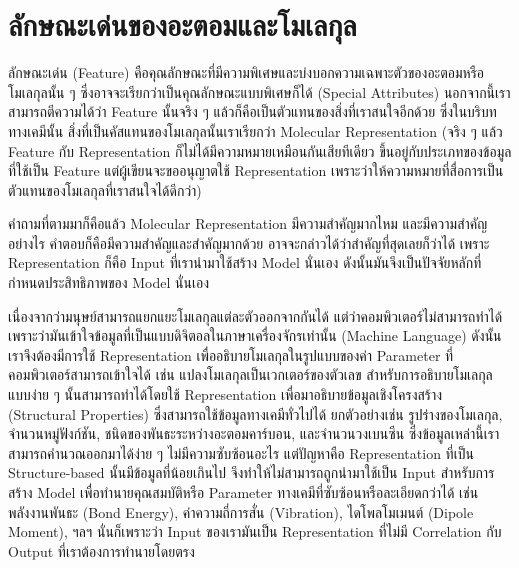

\chapter{ลักษณะเด่นของอะตอมและโมเลกุล}
\label{ch:feature}

ลักษณะเด่น (Feature) คือคุณลักษณะที่มีความพิเศษและบ่งบอกความเฉพาะตัวของอะตอมหรือโมเลกุลนั้น ๆ ซึ่งอาจจะเรียกว่าเป็นคุณลักษณะแบบพิเศษก็ได้ 
(Special Attributes) นอกจากนี้เราสามารถตีความได้ว่า Feature นั้นจริง ๆ แล้วก็คือเป็นตัวแทนของสิ่งที่เราสนใจอีกด้วย ซึ่งในบริบททางเคมีนั้น
สิ่งที่เป็นคัสแทนของโมเลกุลนั้นเราเรียกว่า Molecular Representation (จริง ๆ แล้ว Feature กับ Representation ก็ไม่ได้มีความหมายเหมือนกันเสียทีเดียว
ขึ้นอยู่กับประเภทของข้อมูลที่ใช้เป็น Feature แต่ผู้เขียนจะขออนุญาตใช้ Representation เพราะว่าให้ความหมายที่สื่อการเป็นตัวแทนของโมเลกุลที่เราสนใจได้ดีกว่า)\cite{stepisnik2021}

คำถามที่ตามมาก็คือแล้ว Molecular Representation มีความสำคัญมากไหม และมีความสำคัญอย่างไร คำตอบก็คือมีความสำคัญและสำคัญมากด้วย 
อาจจะกล่าวได้ว่าสำคัญที่สุดเลยก็ว่าได้ เพราะ Representation ก็คือ Input ที่เรานำมาใช้สร้าง Model นั่นเอง ดังนั้นมันจึงเป็นปัจจัยหลักที่กำหนดประสิทธิภาพของ Model นั่นเอง 

เนื่องจากว่ามนุษย์สามารถแยกแยะโมเลกุลแต่ละตัวออกจากกันได้ แต่ว่าคอมพิวเตอร์ไม่สามารถทำได้ เพราะว่ามันเข้าใจข้อมูลที่เป็นแบบดิจิตอลในภาษาเครื่องจักรเท่านั้น (Machine Language)
ดังนั้นเราจึงต้องมีการใช้ Representation เพื่ออธิบายโมเลกุลในรูปแบบของค่า Parameter ที่คอมพิวเตอร์สามารถเข้าใจได้ เช่น แปลงโมเลกุลเป็นเวกเตอร์ของตัวเลข 
สำหรับการอธิบายโมเลกุลแบบง่าย ๆ นั้นสามารถทำได้โดยใช้ Representation เพื่อมาอธิบายข้อมูลเชิงโครงสร้าง (Structural Properties) 
ซึ่งสามารถใช้ข้อมูลทางเคมีทั่วไปได้ ยกตัวอย่างเช่น รูปร่างของโมเลกุล, จำนวนหมู่ฟังก์ชัน, ชนิดของพันธะระหว่างอะตอมคาร์บอน, และจำนวนวงเบนซีน 
ซึ่งข้อมูลเหล่านี้เราสามารถคำนวณออกมาได้ง่าย ๆ ไม่มีความซับซ้อนอะไร แต่ปัญหาคือ Representation ที่เป็น Structure-based นั้นมีข้อมูลที่น้อยเกินไป
จึงทำให้ไม่สามารถถูกนำมาใช้เป็น Input สำหรับการสร้าง Model เพื่อทำนายคุณสมบัติหรือ Parameter ทางเคมีที่ซับซ้อนหรือละเอียดกว่าได้ เช่น 
พลังงานพันธะ (Bond Energy), ค่าความถี่การสั่น (Vibration), ไดโพลโมเมนต์ (Dipole Moment), ฯลฯ 
นั่นก็เพราะว่า Input ของเรามันเป็น Representation ที่ไม่มี Correlation กับ Output ที่เราต้องการทำนายโดยตรง

